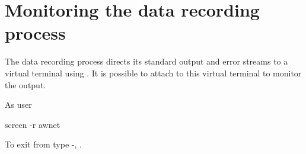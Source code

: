 \section{Monitoring the data recording process}

The data recording process directs its standard output and error
streams to a virtual terminal using . It is possible to
attach to this virtual terminal to monitor the output.

As user \piUser
\begin{PiCmd}
screen -r awnet
\end{PiCmd}

To exit from  type -,
. 




